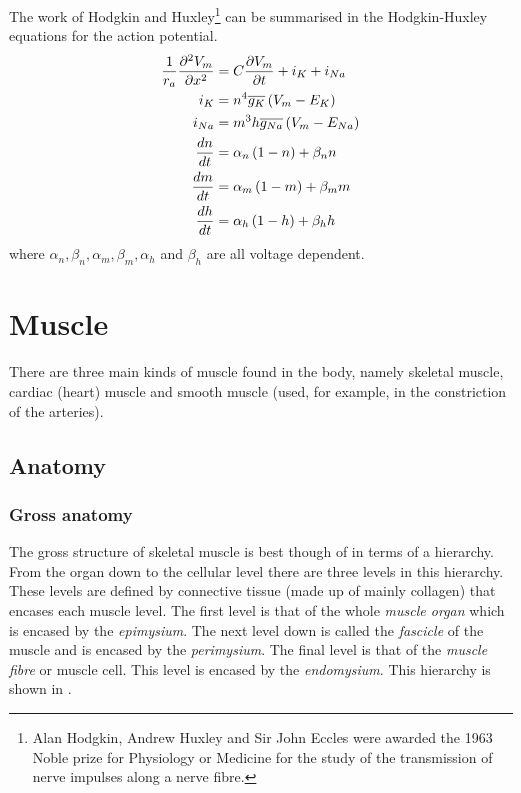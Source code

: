 The work of Hodgkin and Huxley\footnote{Alan Hodgkin, Andrew Huxley and
  Sir John Eccles were awarded the 1963 Noble prize for Physiology or Medicine
  for the study of the transmission of nerve impulses along a nerve fibre.} can
be summarised in the Hodgkin-Huxley equations for the action potential.
\begin{equation}
  \begin{split}
    \dfrac{1}{r_{a}} \dfrac{\partial^{2} V_{m}}{\partial {x}^{2}}  &= C  \dfrac{\partial V_{m}}{\partial t}  + i_{K} 
    + i_{Na} \\
    i_{K} &= n^{4}\overline{g_{K}}\left( V_{m} - E_{K} \right) \\
    i_{Na} &= m^{3}h\overline{g_{Na}}\left( V_{m} - E_{Na} \right) \\
     \dfrac{ d n}{d t}  &= \alpha_{n}\left( 1-n \right)+\beta_{n}n \\
     \dfrac{ d m}{d t}  &= \alpha_{m}\left( 1-m \right)+\beta_{m}m \\
     \dfrac{ d h}{d t}  &= \alpha_{h}\left( 1-h \right)+\beta_{h}h
  \end{split}
  \label{eqn:hodgkin-huxley}
\end{equation}
where $\alpha_{n},\beta_{n},\alpha_{m},\beta_{m},\alpha_{h}$ and $\beta_{h}$
are all voltage dependent.

\section{Muscle}

There are three main kinds of muscle found in the body, namely skeletal
muscle, cardiac (heart) muscle and smooth muscle (used, for example, in the
constriction of the arteries).

\subsection{Anatomy}

\subsubsection{Gross anatomy}

The gross structure of skeletal muscle is best though of in terms of a
hierarchy. From the organ down to the cellular level there are three levels in
this hierarchy. These levels are defined by connective tissue (made up of
mainly collagen) that encases each muscle level. The first level is that of the
whole \emph{muscle organ} which is encased by the \emph{epimysium}. The next
level down is called the \emph{fascicle} of the muscle and is encased by the
\emph{perimysium}. The final level is that of the \emph{muscle fibre} or
muscle cell. This level is encased by the \emph{endomysium}. This hierarchy is
shown in .

